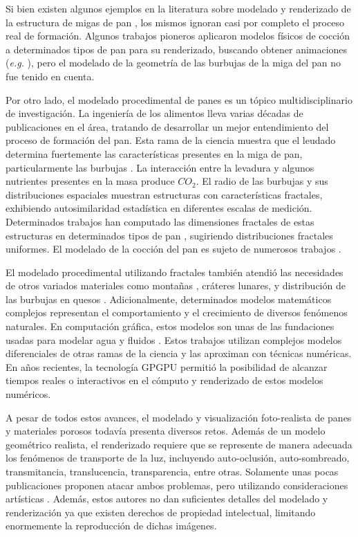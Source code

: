 Si bien existen algunos ejemplos en la literatura sobre modelado y renderizado de la estructura de migas de pan \cite{Tong2005,Xenakis2007}, los mismos ignoran casi por completo el proceso real de formación.
Algunos trabajos pioneros aplicaron modelos físicos de cocción a determinados tipos de pan para su renderizado, buscando obtener animaciones ({\em e.g.} \cite{Rodriguez-Arenas2011}), pero el modelado de la geometría de las burbujas de la miga del pan no fue tenido en cuenta.

Por otro lado, el modelado procedimental de panes es un tópico multidisciplinario de investigación.
La ingeniería de los alimentos lleva varias décadas de publicaciones en el área, tratando de desarrollar un mejor entendimiento del proceso de formación del pan.
Esta rama de la ciencia muestra que el leudado determina fuertemente las características presentes en la miga de pan, particularmente las burbujas \cite{Babin2006}.
La interacción entre la levadura y algunos nutrientes presentes en la masa produce {\em $CO_{2}$}. 
El radio de las burbujas y sus distribuciones espaciales muestran estructuras con características fractales, exhibiendo autosimilaridad estadística en diferentes escalas de medición.
Determinados trabajos han computado las dimensiones fractales de estas estructuras en determinados tipos de pan \cite{Gonzales2008}, sugiriendo distribuciones fractales uniformes.
El modelado de la cocción del pan es sujeto de numerosos trabajos \cite{Mondal2008}.

El modelado procedimental utilizando fractales también atendió las necesidades de otros variados materiales como montañas \cite{Prusinkiewicz1993}, cráteres lunares, y distribución de las burbujas en quesos \cite{Mandelbrot1983}. 
Adicionalmente, determinados modelos matemáticos complejos representan el comportamiento y el crecimiento de diversos fenómenos naturales.
En computación gráfica, estos modelos son unas de las fundaciones usadas para modelar agua y fluidos \cite{Stam1999,Fedkiw2001}.
Estos trabajos utilizan complejos modelos diferenciales de otras ramas de la ciencia y las aproximan con técnicas numéricas.
En años recientes, la tecnología GPGPU \cite{Owens2007} permitió la posibilidad de alcanzar tiempos reales o interactivos en el cómputo y renderizado de estos modelos numéricos.

A pesar de todos estos avances, el modelado y visualización foto-realista de panes y materiales porosos todavía presenta diversos retos.
Además de un modelo geométrico realista, el renderizado requiere que se represente de manera adecuada los fenómenos de transporte de la luz, incluyendo auto-oclusión, auto-sombreado, transmitancia, translucencia, transparencia, entre otras.
Solamente unas pocas publicaciones proponen atacar ambos problemas, pero utilizando consideraciones artísticas \cite{Xenakis2007}.
Además, estos autores no dan suficientes detalles del modelado y renderización ya que existen derechos de propiedad intelectual, limitando enormemente la reproducción de dichas imágenes.

